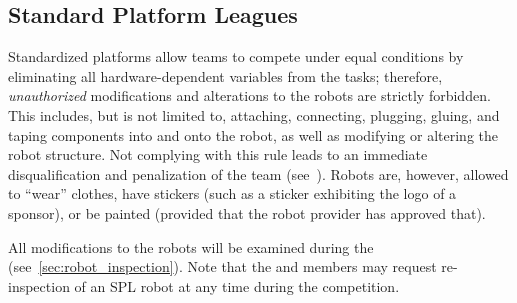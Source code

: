 \subsection{Standard Platform Leagues}

Standardized platforms allow teams to compete under equal conditions by eliminating all hardware-dependent variables from the tasks; therefore, \emph{unauthorized} modifications and alterations to the robots are strictly forbidden.
This includes, but is not limited to, attaching, connecting, plugging, gluing, and taping components into and onto the robot, as well as modifying or altering the robot structure.
Not complying with this rule leads to an immediate disqualification and penalization of the team (see~).
Robots are, however, allowed to \enquote{wear} clothes, have stickers (such as a sticker exhibiting the logo of a sponsor), or be painted (provided that the robot provider has approved that).

All modifications to the robots will be examined during the \RobotInspection{} (see~\ref{sec:robot_inspection}).
Note that the \EC{} and \TC{} members may request re-inspection of an SPL robot at any time during the competition.

